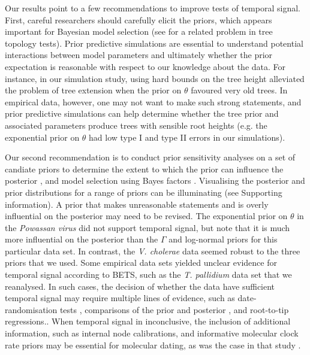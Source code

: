\documentclass[10pt,letterpaper]{article}
\begin{document}
Our results point to a few recommendations to improve tests of temporal signal. First, careful researchers should carefully elicit the priors, which appears important for Bayesian model selection (see \cite{bergsten2013bayesian} for a related problem in tree topology tests). Prior predictive simulations are essential to understand potential interactions between model parameters and ultimately whether the prior expectation is reasonable with respect to our knowledge about the data. For instance, in our simulation study, using hard bounds on the tree height alleviated the problem of tree extension when the prior on $\theta$ favoured very old trees. In empirical data, however, one may not want to make such strong statements, and prior predictive simulations can help determine whether the tree prior and associated parameters produce trees with sensible root heights (e.g. the exponential prior on $\theta$ had low type I and type II errors in our simulations). 

Our second recommendation is to conduct prior sensitivity analyses on a set of candiate priors to determine the extent to which the prior can influence the posterior \cite{foster2017evaluating, lopes2011confronting}, and model selection using Bayes factors \cite{lambert2018student}. Visualising the posterior and prior distributions for a range of priors can be illuminating (see Supporting information). A prior that makes unreasonable statements and is overly influential on the posterior may need to be revised. The exponential prior on $\theta$ in the \textit{Powassan virus} did not support temporal signal, but note that it is much more influential on the posterior than the $\Gamma$ and log-normal priors for this particular data set. In contrast, the \textit{V. cholerae} data seemed robust to the three priors that we used. Some empirical data sets yielded unclear evidence for temporal signal according to BETS, such as the \textit{T. pallidium} data set that we reanalysed. In such cases, the decision of whether the data have sufficient temporal signal may require multiple lines of evidence, such as date-randomisation tests \cite{duchene2015performance, ramsden2009hantavirus}, comparisons of the prior and posterior \cite{duchene2020estimating}, and root-to-tip regressions.\cite{featherstone2023clockor2, rambaut2016exploring}. When temporal signal in inconclusive, the inclusion of additional information, such as internal node calibrations, and informative molecular clock rate priors may be essential for molecular dating, as was the case in that study \cite{majander2020ancient}.
\end{document}
